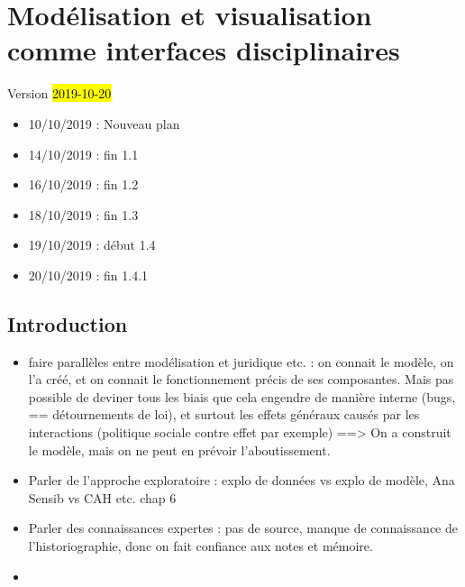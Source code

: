 %

\chapter{Modélisation et visualisation comme interfaces disciplinaires}
\label{chap:chap1}
\begin{center}
	{\large Version \hl{2019-10-20}}
\end{center}

\begin{itemize}
	\item 10/10/2019 : Nouveau plan
	\item 14/10/2019 : fin 1.1
	\item 16/10/2019 : fin 1.2
	\item 18/10/2019 : fin 1.3
	\item 19/10/2019 : début 1.4
	\item 20/10/2019 : fin 1.4.1
\end{itemize} 

\minitoc

\clearpage
\section*{Introduction}

\begin{itemize}
	\item faire parallèles entre modélisation et juridique etc. : on connait le modèle, on l'a créé, et on connait le fonctionnement précis de ses composantes. Mais pas possible de deviner tous les biais que cela engendre de manière interne (bugs, == détournements de loi), et surtout les effets généraux causés par les interactions (politique sociale contre effet par exemple) ==> On a construit le modèle, mais on ne peut en prévoir l'aboutissement.
	\item Parler de l'approche exploratoire : explo de données vs explo de modèle, Ana Sensib vs CAH etc. chap  6
	\item Parler des connaissances expertes : pas de source, manque de connaissance de l'historiographie, donc on fait confiance aux notes et mémoire.
	\item 
\end{itemize}


